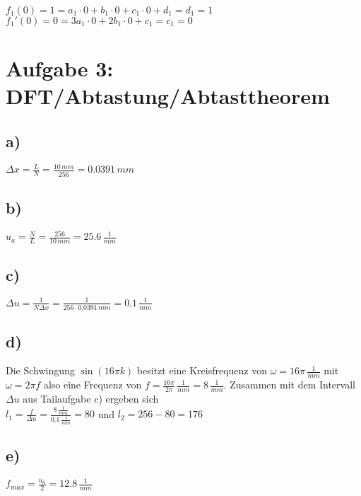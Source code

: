 \documentclass[a4paper,11pt,oneside]{scrartcl}
\begin{document}
$f_1(0) = 1 = a_1 \cdot 0 + b_1 \cdot 0 + c_1 \cdot 0 + d_1 = d_1 = 1$\\
$f_1'(0) = 0 = 3a_1 \cdot 0 + 2b_1 \cdot 0 + c_1 = c_1 = 0$\\

\newpage

\section*{Aufgabe 3: DFT/Abtastung/Abtasttheorem}
\subsection*{a)}

$\Delta x=\frac{L}{N}=\frac{10\,mm}{256}=0.0391\,mm$

\subsection*{b)}

$u_{a}=\frac{N}{L}=\frac{256}{10\,mm}=25.6\,\frac{1}{mm}$

\subsection*{c)}

$\Delta u=\frac{1}{N\Delta x}=\frac{1}{256\cdot0.0391\,mm}= 0.1\,\frac{1}{mm}$

\subsection*{d)}

Die Schwingung $\sin(16\pi k)$ besitzt eine Kreisfrequenz von $\omega=16\pi\,\frac{1}{mm}$ mit $\omega=2\pi f$ also eine Frequenz von $f=\frac{16\pi}{2\pi}\,\frac{1}{mm}=8\,\frac{1}{mm}$. Zusammen mit dem Intervall $\Delta u$ aus Tailaufgabe c) ergeben sich \\

$l_{1}=\frac{f}{\Delta u}=\frac{8\,\frac{1}{mm}}{0.1\,\frac{1}{mm}}=80$ und $l_{2}=256-80=176$

\subsection*{e)}

$f_{max}=\frac{u_{a}}{2}=12.8\,\frac{1}{mm}$
\end{document}
